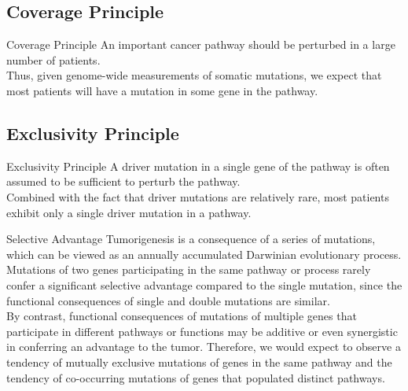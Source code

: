\documentclass[xcolor=dvipsnames]{beamer}
\begin{document}
\subsection{Coverage Principle}
\begin{frame}{Coverage Principle}
An important cancer pathway should be perturbed in a large number of patients.\\
Thus, given genome-wide measurements of somatic mutations, we expect that most patients will have a mutation in some gene in the pathway.
\end{frame}
\subsection{Exclusivity Principle}
\begin{frame}{Exclusivity Principle}
A driver mutation in a single gene of the pathway is often assumed to be sufficient to perturb the pathway.\\
Combined with the fact that driver mutations are relatively rare, most patients exhibit only a single driver mutation in a pathway.\\
\end{frame}
\begin{frame}{Selective Advantage}
Tumorigenesis is a consequence of a series of mutations, which can be viewed as an annually accumulated Darwinian evolutionary process.\\
Mutations of two genes participating in the same pathway or process rarely confer a significant selective advantage compared to the single mutation, since the functional consequences of single and double mutations are similar.\\
By contrast, functional consequences of mutations of multiple genes that participate in different pathways or functions may be additive or even synergistic in conferring an advantage to the tumor. Therefore, we would expect to observe a tendency of mutually exclusive mutations of genes in the same pathway and the tendency of co-occurring mutations of genes that populated distinct pathways.\\
\end{frame}
\end{document}

